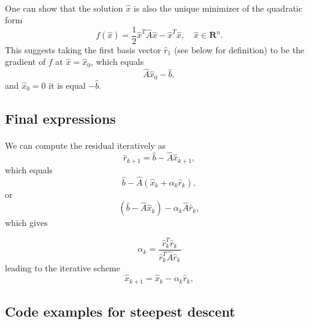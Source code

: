 \documentclass[%
oneside,                 %
final,                   %
10pt]{article}
\begin{document}
\paragraph{}
One can show that the solution $\hat{x}$ is also the unique minimizer of the quadratic form
\begin{equation*}
  f(\hat{x}) = \frac{1}{2}\hat{x}^T\hat{A}\hat{x} - \hat{x}^T \hat{x} , \quad \hat{x}\in\mathbf{R}^n. 
\end{equation*}
This suggests taking the first basis vector $\hat{r}_1$ (see below for definition) 
to be the gradient of $f$ at $\hat{x}=\hat{x}_0$, 
which equals
\begin{equation*}
\hat{A}\hat{x}_0-\hat{b},
\end{equation*}
and 
$\hat{x}_0=0$ it is equal $-\hat{b}$.



\subsection{Final expressions}

\paragraph{}
We can compute the residual iteratively as
\begin{equation*}
\hat{r}_{k+1}=\hat{b}-\hat{A}\hat{x}_{k+1},
 \end{equation*}
which equals
\begin{equation*}
\hat{b}-\hat{A}(\hat{x}_k+\alpha_k\hat{r}_k),
 \end{equation*}
or
\begin{equation*}
(\hat{b}-\hat{A}\hat{x}_k)-\alpha_k\hat{A}\hat{r}_k,
 \end{equation*}
which gives

\[
\alpha_k = \frac{\hat{r}_k^T\hat{r}_k}{\hat{r}_k^T\hat{A}\hat{r}_k}
\]
leading to the iterative scheme
\begin{equation*}
\hat{x}_{k+1}=\hat{x}_k-\alpha_k\hat{r}_{k},
 \end{equation*}




\subsection{Code examples for steepest descent}
\end{document}
